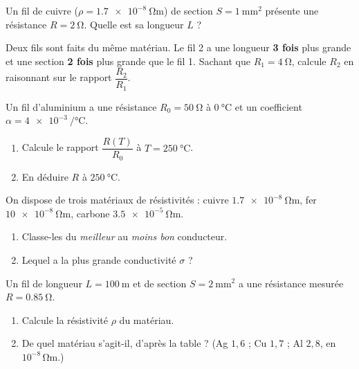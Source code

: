\documentclass[11pt,a4paper]{article}
\begin{document}
\usetikzlibrary{babel}
\begin{exo}
Un fil de cuivre ($\rho=\qty{1.7e-8}{\ohm\metre}$) de section $S=\qty{1}{\milli\metre\squared}$
présente une résistance $R=\qty{2}{\ohm}$. Quelle est sa longueur $L$ ?
\end{exo}

\begin{exo}
Deux fils sont faits du même matériau. Le fil 2 a une longueur \textbf{3 fois} plus grande et une
section \textbf{2 fois} plus grande que le fil 1. Sachant que $R_1=\qty{4}{\ohm}$, calcule $R_2$ en
raisonnant sur le rapport $\dfrac{R_2}{R_1}$.
\end{exo}

\begin{exo}
Un fil d'aluminium a une résistance $R_0=\qty{50}{\ohm}$ à $\qty{0}{\degreeCelsius}$ et un coefficient
$\alpha=\qty{4e-3}{\per\degreeCelsius}$.
\begin{enumerate}[label=\alph*)]
  \item Calcule le rapport $\dfrac{R(T)}{R_0}$ à $T=\qty{250}{\degreeCelsius}$.
  \item En déduire $R$ à $\qty{250}{\degreeCelsius}$.
\end{enumerate}
\end{exo}

\begin{exo}
On dispose de trois matériaux de résistivités : cuivre $\qty{1.7e-8}{\ohm\metre}$, fer
$\qty{10e-8}{\ohm\metre}$, carbone $\qty{3.5e-5}{\ohm\metre}$.
\begin{enumerate}[label=\alph*)]
  \item Classe-les du \emph{meilleur} au \emph{moins bon} conducteur.
  \item Lequel a la plus grande conductivité $\sigma$ ?
\end{enumerate}
\end{exo}

\begin{exo}
Un fil de longueur $L=\qty{100}{\metre}$ et de section $S=\qty{2}{\milli\metre\squared}$ a une
résistance mesurée $R=\qty{0.85}{\ohm}$.
\begin{enumerate}[label=\alph*)]
  \item Calcule la résistivité $\rho$ du matériau.
  \item De quel matériau s'agit-il, d'après la table ? (Ag $1{,}6$ ; Cu $1{,}7$ ; Al $2{,}8$, en
        $10^{-8}\,\si{\ohm\metre}$.)
\end{enumerate}
\end{exo}
\end{document}
